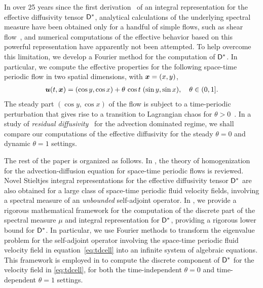 \documentclass[amsa]{ipart}
\begin{document}
In over 25 years since the first derivation~\cite{Avellaneda:PRL-753}
of an integral representation for the effective diffusivity tensor
$\mathsf{D}^*$, analytical calculations of the underlying spectral measure
have been obtained only for a handful of simple flows, such as
shear flow~\cite{Avellaneda:CMP-339}, and numerical computations of
the effective behavior based on this powerful representation have
apparently not been attempted. To help overcome this limitation, we
develop a Fourier method for the computation of $\mathsf{D}^*$. In
particular, we compute the effective properties for the following
space-time periodic flow in two spatial dimensions, with $\boldsymbol{x}=(x,y)$,
%
\begin{align}\label{eq:tdcell}
\vecu (t,\vecx)=(\cos{y},\cos{x}) + \theta\,\cos{t}\;(\sin{y},\sin{x}), 
\quad
\theta \in (0,1].
\end{align}
%
The steady part $(\cos{y}, \cos{x})$ of the flow is subject to a
time-periodic perturbation that gives rise to a transition to
Lagrangian chaos for $\theta>0$~\cite{Biferale:PF:2725,ZCX_2015}. In a
study of \emph{residual
  diffusivity}~\cite{Biferale:PF:2725,ZCX_2015} for the advection 
dominated regime, we shall compare our computations of the effective
diffusivity for the steady $\theta=0$ and dynamic $\theta=1$ settings.   



The rest of the paper is organized as follows. In
, the theory of homogenization for the
advection-diffusion equation for space-time periodic flows is
reviewed. Novel Stieltjes integral representations for the effective
diffusivity tensor $\mathsf{D}^*$ are also obtained for a large class of
space-time periodic fluid velocity fields, involving a spectral
measure of an \emph{unbounded} self-adjoint operator. In
, we provide a rigorous mathematical
framework for the computation of the discrete part of the spectral
measure $\mu$ and integral representation for $\mathsf{D}^*$, providing a
rigorous lower bound for $\mathsf{D}^*$. In particular, we use
Fourier methods to transform the eigenvalue problem for the
self-adjoint operator involving the space-time periodic fluid velocity
field in equation~\eqref{eq:tdcell} into an infinite system of algebraic
equations. This framework is employed in  
to compute the discrete component of $\mathsf{D}^*$ for the velocity field in
\eqref{eq:tdcell}, for both the time-independent $\theta=0$ and
time-dependent $\theta=1$ settings.
\end{document}

